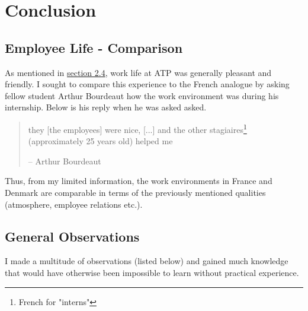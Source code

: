 \section{Conclusion}

\subsection{Employee Life - Comparison}

As mentioned in \hyperlink{subsection.2.4}{section 2.4}, work life at ATP was
generally pleasant and friendly. I sought to compare this experience to the
French analogue by asking fellow student Arthur Bourdeaut how the work
environment was during his internship. Below is his reply when he was asked
asked.

\begin{quote}
    \color{dgreen} they [the employees] were nice, [...] and the other
    stagiaires\footnote[0]{French for "interns"} (approximately 25 years old)
    helped me

    \color{black} -- Arthur Bourdeaut
\end{quote}

Thus, from my limited information, the work environments in France and Denmark
are comparable in terms of the previously mentioned qualities (atmosphere,
employee relations etc.).

\subsection{General Observations}

I made a multitude of observations (listed below) and gained much knowledge that
would have otherwise been impossible to learn without practical experience.

